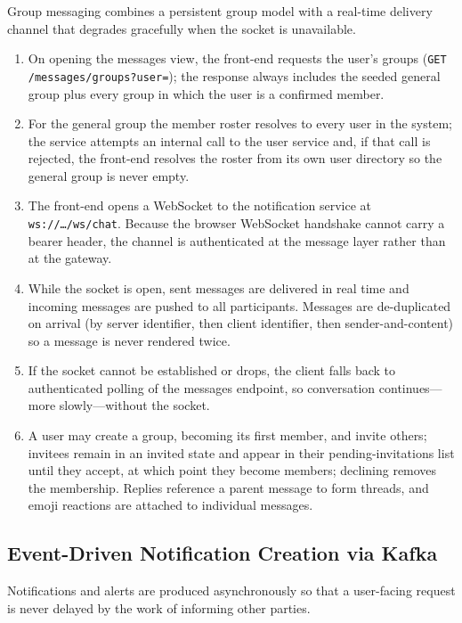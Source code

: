 Group messaging combines a persistent group model with a real-time delivery channel that
degrades gracefully when the socket is unavailable.

\begin{enumerate}
  \item On opening the messages view, the front-end requests the user's groups
  (\texttt{GET /messages/groups?user=}); the response always includes the seeded general
  group plus every group in which the user is a confirmed member.
  \item For the general group the member roster resolves to every user in the system; the
  service attempts an internal call to the user service and, if that call is rejected, the
  front-end resolves the roster from its own user directory so the general group is never
  empty.
  \item The front-end opens a WebSocket to the notification service at
  \texttt{ws://\dots/ws/chat}. Because the browser WebSocket handshake cannot carry a bearer
  header, the channel is authenticated at the message layer rather than at the gateway.
  \item While the socket is open, sent messages are delivered in real time and incoming
  messages are pushed to all participants. Messages are de-duplicated on arrival (by server
  identifier, then client identifier, then sender-and-content) so a message is never rendered
  twice.
  \item If the socket cannot be established or drops, the client falls back to authenticated
  polling of the messages endpoint, so conversation continues---more slowly---without the
  socket.
  \item A user may create a group, becoming its first member, and invite others; invitees
  remain in an invited state and appear in their pending-invitations list until they accept,
  at which point they become members; declining removes the membership. Replies reference a
  parent message to form threads, and emoji reactions are attached to individual messages.
\end{enumerate}

\subsection{Event-Driven Notification Creation via Kafka}
\label{sec:flow-notify}

Notifications and alerts are produced asynchronously so that a user-facing request is never
delayed by the work of informing other parties.

